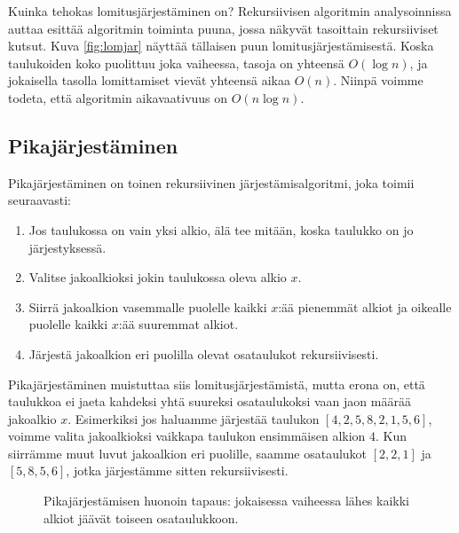 Kuinka tehokas lomitusjärjestäminen on?
Rekursiivisen algoritmin analysoinnissa auttaa esittää
algoritmin toiminta puuna,
jossa näkyvät tasoittain rekursiiviset kutsut.
Kuva \ref{fig:lomjar} näyttää tällaisen puun lomitusjärjestämisestä.
Koska taulukoiden koko puolittuu joka vaiheessa,
tasoja on yhteensä $O(\log n)$,
ja jokaisella tasolla lomittamiset vievät yhteensä aikaa $O(n)$.
Niinpä voimme todeta, että algoritmin aikavaativuus on $O(n \log n)$.

\subsection{Pikajärjestäminen}

Pikajärjestäminen on toinen rekursiivinen järjestämisalgoritmi,
joka toimii seuraavasti:

\begin{enumerate}
\item Jos taulukossa on vain yksi alkio,
älä tee mitään, koska taulukko on jo järjestyksessä.
\item Valitse jakoalkioksi jokin taulukossa oleva alkio $x$.
\item Siirrä jakoalkion vasemmalle puolelle kaikki $x$:ää pienemmät alkiot
ja oikealle puolelle kaikki $x$:ää suuremmat alkiot.
\item Järjestä jakoalkion eri puolilla olevat osataulukot rekursiivisesti.
\end{enumerate}

Pikajärjestäminen muistuttaa siis lomitusjärjestämistä,
mutta erona on, että taulukkoa ei jaeta kahdeksi yhtä suureksi
osataulukoksi vaan jaon määrää jakoalkio $x$.
Esimerkiksi jos haluamme järjestää taulukon $[4,2,5,8,2,1,5,6]$,
voimme valita jakoalkioksi vaikkapa taulukon ensimmäisen alkion $4$.
Kun siirrämme muut luvut jakoalkion eri puolille,
saamme osataulukot $[2,2,1]$ ja $[5,8,5,6]$, jotka järjestämme
sitten rekursiivisesti.

\begin{figure}
\center
{}
\caption{Pikajärjestämisen huonoin tapaus: jokaisessa vaiheessa lähes kaikki
alkiot jäävät toiseen osataulukkoon.}
\label{fig:pikjar}
\end{figure}

